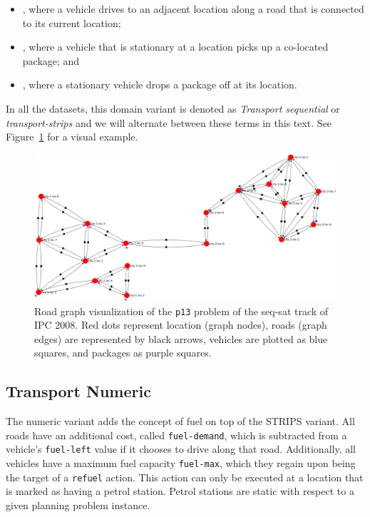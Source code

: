 \begin{itemize}
\item \drive{}, where a vehicle drives to an adjacent location
along a road that is connected to its current location;
\item \pickup{}, where a vehicle that is stationary at a location picks up a co-located package; and
\item \drop{}, where a stationary vehicle drops a package off at its location.
\end{itemize}

In all the datasets, this domain variant is denoted as \textit{Transport sequential}
or \textit{transport-strips} and we will alternate between these terms in this text. See Figure~\ref{fig:ipc08_seq-sat_p13} for a visual example.

\begin{figure}[tbp]
\begin{center}
\includegraphics[width=1.0\textwidth]{../img/ipc08_seq-sat_p13_land2}
\end{center}
\caption[Visualization of the \texttt{p13} problem of sequential Transport from IPC 2008.]{Road graph visualization of the \texttt{p13} problem of the seq-sat track of IPC 2008. Red dots represent location (graph nodes), roads (graph edges) are represented by black arrows, vehicles are plotted as blue squares, and packages as purple squares.}
\label{fig:ipc08_seq-sat_p13}
\end{figure}

\subsection{Transport Numeric}\label{transport-numeric}

The numeric variant adds the concept of fuel on top of the STRIPS variant.
All roads have an additional cost, called \verb+fuel-demand+, which is
subtracted from a vehicle's \verb+fuel-left+ value if it chooses to drive along that road.
Additionally, all vehicles have a maximum fuel capacity \verb+fuel-max+,
which they regain upon being the target of a \verb+refuel+ action. This action can only
be executed at a location that is marked as having a petrol station. Petrol stations
are static with respect to a given planning problem instance.

